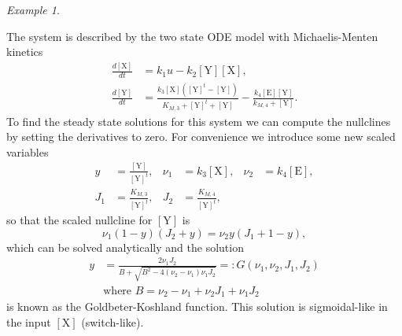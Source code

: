 \documentclass[a4paper]{article}
\newcommand{\co}[1]{[\text{#1}]} %
\theoremstyle{plain}
\theoremstyle{definition}
\theoremstyle{remark}
\newtheorem*{example}{Example}
\begin{document}
\begin{example}
\begin{center}
  \end{center}
  The system is described by the two state ODE model with Michaelis-Menten
  kinetics
  \begin{align*}
    \frac{d\co{X}}{dt} &= k_1 u - k_2 \co{Y} \co{X}, \\
    \frac{d\co{Y}}{dt} &= \frac{
      k_3\co{X}(\co{Y}^t - \co{Y})
    }{
      K_{M,3} + \co{Y}^t + \co{Y}
    }
    - \frac{
      k_4 \co{E} \co{Y}
    }{
      k_{M,4} + \co{Y}
    }.
  \end{align*}
  To find the steady state solutions for this system we can compute the
  nullclines by setting the derivatives to zero. For convenience we introduce
  some new scaled variables
  \begin{align*}
    y &= \frac{\co{Y}}{\co{Y}^t},
      & \nu_1 &= k_3 \co{X},
      & \nu_2 &= k_4 \co{E}, \\
    J_1 &= \frac{K_{M,3}}{\co{Y}^t},
      & J_2 &= \frac{K_{M,4}}{\co{Y}^t},
  \end{align*}
  so that the scaled nullcline for $\co{Y}$ is
  \[
    \nu_1 (1 - y) (J_2 + y) = \nu_2 y (J_1 + 1 - y),
  \]
  which can be solved analytically and the solution
  \begin{align*}
    y &= \frac{
      2\nu_1 J_2
    }{
      B + \sqrt{B^2 - 4 (\nu_2 - \nu_1) \nu_1 J_2}
    } =: G(\nu_1, \nu_2, J_1, J_2) \\
    &\text{where } B = \nu_2 - \nu_1 + \nu_2 J_1 + \nu_1 J_2
  \end{align*}
  is known as the Goldbeter-Koshland function. This solution is sigmoidal-like
  in the input $\co{X}$ (switch-like).
\end{example}
\end{document}
